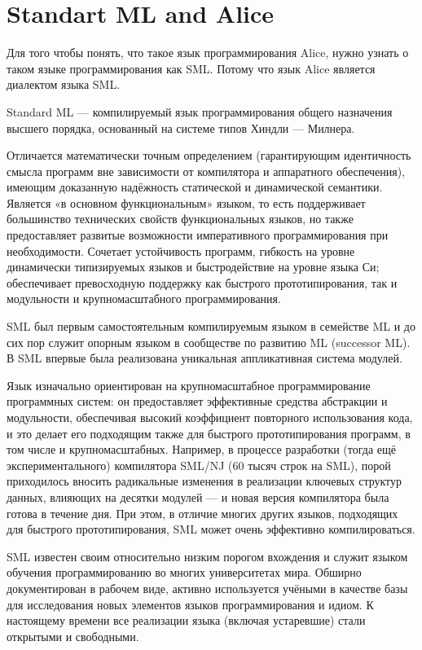 \documentclass[14pt]{article}
\begin{document}
  
\section*{Standart ML and Alice} 

Для того чтобы понять, что такое язык программирования Alice, нужно узнать о таком языке программирования как SML. Потому что язык Alice является диалектом языка SML.

Standard ML — компилируемый язык программирования общего назначения высшего порядка, основанный на системе типов Хиндли — Милнера.

Отличается математически точным определением (гарантирующим идентичность смысла программ вне зависимости от компилятора и аппаратного обеспечения), имеющим доказанную надёжность статической и динамической семантики. Является «в основном функциональным» языком, то есть поддерживает большинство технических свойств функциональных языков, но также предоставляет развитые возможности императивного программирования при необходимости. Сочетает устойчивость программ, гибкость на уровне динамически типизируемых языков и быстродействие на уровне языка Си; обеспечивает превосходную поддержку как быстрого прототипирования, так и модульности и крупномасштабного программирования.

SML был первым самостоятельным компилируемым языком в семействе ML и до сих пор служит опорным языком в сообществе по развитию ML (successor ML). В SML впервые была реализована уникальная аппликативная система модулей.

Язык изначально ориентирован на крупномасштабное программирование программных систем: он предоставляет эффективные средства абстракции и модульности, обеспечивая высокий коэффициент повторного использования кода, и это делает его подходящим также для быстрого прототипирования программ, в том числе и крупномасштабных. Например, в процессе разработки (тогда ещё экспериментального) компилятора SML/NJ (60 тысяч строк на SML), порой приходилось вносить радикальные изменения в реализации ключевых структур данных, влияющих на десятки модулей — и новая версия компилятора была готова в течение дня. При этом, в отличие многих других языков, подходящих для быстрого прототипирования, SML может очень эффективно компилироваться.

SML известен своим относительно низким порогом вхождения и служит языком обучения программированию во многих университетах мира. Обширно документирован в рабочем виде, активно используется учёными в качестве базы для исследования новых элементов языков программирования и идиом. К настоящему времени все реализации языка (включая устаревшие) стали открытыми и свободными.
\end{document}
